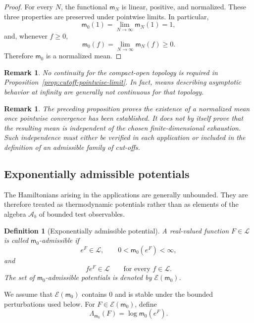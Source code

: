 \documentclass[11pt,reqno]{amsart}
\newtheorem{Definition}[Theorem]{Definition}
\newtheorem{rem}[Theorem]{Remark}
\begin{document}
\begin{proof}
For every $N$, the functional $\mathsf m_N$ is linear, positive, and
normalized. These three properties are preserved under pointwise
limits. In particular,
\[
\mathsf m_0(1)
=
\lim_{N\to\infty}\mathsf m_N(1)
=
1,
\]
and, whenever $f\geq 0$,
\[
\mathsf m_0(f)
=
\lim_{N\to\infty}\mathsf m_N(f)
\geq 0.
\]
Therefore $\mathsf m_0$ is a normalized mean.
\end{proof}

\begin{rem}
No continuity for the compact-open topology is required in
Proposition~\ref{prop:cutoff-pointwise-limit}. In fact, means describing
asymptotic behavior at infinity are generally not continuous for that
topology.
\end{rem}

\begin{rem}
The preceding proposition proves the existence of a normalized mean
once pointwise convergence has been established. It does not by itself
prove that the resulting mean is independent of the chosen
finite-dimensional exhaustion. Such independence must either be
verified in each application or included in the definition of an
admissible family of cut-offs.
\end{rem}

\subsection{Exponentially admissible potentials}

The Hamiltonians arising in the applications are generally unbounded.
They are therefore treated as thermodynamic potentials rather than as
elements of the algebra $\mathcal A_b$ of bounded test observables.

\begin{Definition}[Exponentially admissible potential]
\label{def:admissible-potential}
A real-valued function $F\in\mathcal L$ is called
\emph{$\mathsf m_0$-admissible} if
\[
e^F\in\mathcal L,
\qquad
0<\mathsf m_0(e^F)<\infty,
\]
and
\[
fe^F\in\mathcal L
\qquad
\text{for every }f\in\mathcal L.
\]
The set of $\mathsf m_0$-admissible potentials is denoted by
$\mathcal E(\mathsf m_0)$.
\end{Definition}

We assume that $\mathcal E(\mathsf m_0)$ contains $0$ and is stable
under the bounded perturbations used below. For
$F\in\mathcal E(\mathsf m_0)$, define
\[
\Lambda_{\mathsf m_0}(F)
=
\log\mathsf m_0(e^F).
\]
\end{document}
